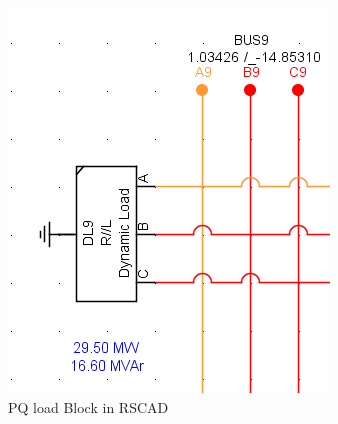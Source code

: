 \begin{figure}[h]
\includegraphics[width=\textwidth]{Figures/load.png}
\caption{PQ load Block in RSCAD}\label{fig:load}
\end{figure}

